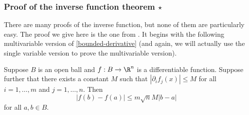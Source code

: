 \subsubsection*{Proof of the inverse function theorem  \texorpdfstring{$\star$}{*}}

There are many proofs of the inverse function, but none of them are particularly easy. The proof we give here is the one from \cite[chapter 2]{spivak_calculus}. It begins with the following multivariable version of \cref{bounded-derivative} (and again, we will actually use the single variable version to prove the multivariable version). 

\begin{lemma} \label{bounded-deriv-multivar}
	Suppose $B$ is an open ball and $f : B \to \R^n$ is a differentiable function. Suppose further that there exists a constant $M$ such that $|\partial_i f_j(x)| \leq M$ for all $i = 1, \dotsc, m$ and $j = 1, \dotsc, n$. Then
	\[ |f(b) - f(a)| \leq m\sqrt{n} M |b-a| \]
	for all $a, b \in B$. 
\end{lemma}

